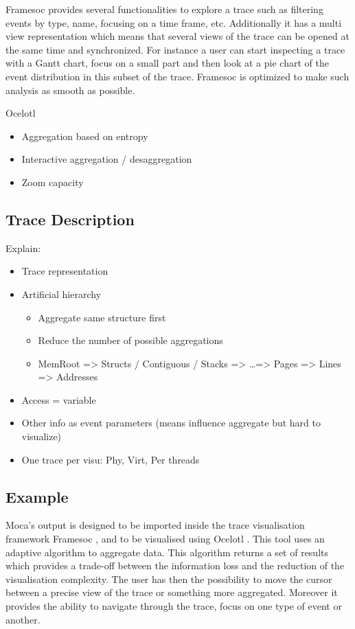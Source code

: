 \gls{Framesoc} provides several functionalities to explore a trace such as filtering events by type, name, focusing on a time frame, etc.
Additionally it has a multi view representation which means that several views of the trace can be opened at the same time and synchronized.
For instance a user can start inspecting a trace with a Gantt chart, focus on a small part and then look at a pie chart of the event distribution in this subset of the trace.
\gls{Framesoc} is optimized to make such analysis as smooth as possible.


\gls{Ocelotl}~\cite{Pagano13TraceRR}
\begin{itemize}
    \item Aggregation based on entropy
    \item Interactive aggregation / desaggregation
    \item Zoom capacity
\end{itemize}

\subsection{Trace Description}

Explain:
\begin{itemize}
    \item Trace representation
    \item Artificial hierarchy
        \begin{itemize}
            \item Aggregate same structure first
            \item Reduce the number of possible aggregations
            \item MemRoot => Structs / Contiguous / Stacks => \ldots => Pages => Lines => Addresses
        \end{itemize}
    \item Access = variable
    \item Other info as event parameters (means influence aggregate but hard to visualize)
    \item One trace per visu: Phy, Virt, Per threads
\end{itemize}

\subsection{Example}


\gls{Moca}'s output is designed to be imported inside the trace visualisation framework \gls{Framesoc} \cite{Pagano13Trace}, and to be visualised using \gls{Ocelotl} \cite{Dosimont14Trace}.
This tool uses an adaptive algorithm to aggregate data.
This algorithm returns a set of results which provides a trade-off between the information loss and the reduction of the visualisation complexity.
The user has then the possibility to move the cursor between a precise view of the trace or something more aggregated.
Moreover it provides the ability to navigate through the trace, focus on one type of event or another.

